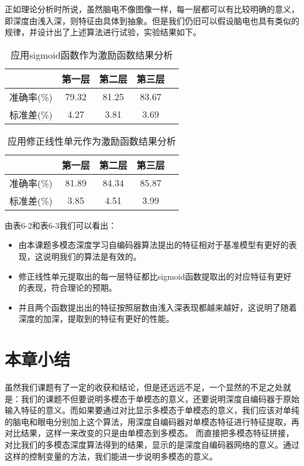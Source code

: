 	正如理论分析时所说，虽然脑电不像图像一样，每一层都可以有比较明确的意义，即深度由浅入深，则特征由具体到抽象。但是我们仍旧可以假设脑电也具有类似的规律，并设计出了上述算法进行试验，实验结果如下。
	
	\begin{table}[!hbp]
	\centering
\begin{tabular}{|c|c|c|c|c|}
\hline
\hline
  & 第一层 & 第二层 & 第三层 \\
\hline
准确率(\%) & 79.32 & 81.25 & 83.67\\
\hline
标准差(\%) & 4.27 & 3.81 & 3.69 \\
\hline
\end{tabular}
\caption{应用sigmoid函数作为激励函数结果分析}
\end{table} 

	\begin{table}[!hbp]
	\centering
\begin{tabular}{|c|c|c|c|c|}
\hline
\hline
  & 第一层 & 第二层 & 第三层 \\
\hline
准确率(\%) & 81.89 & 84.34 & 85.87\\
\hline
标准差(\%) & 3.85 & 4.51 & 3.99 \\
\hline
\end{tabular}
\caption{应用修正线性单元作为激励函数结果分析}
\end{table} 

	由表6-2和表6-3我们可以看出：
	\begin{itemize}
	\item 由本课题多模态深度学习自编码器算法提出的特征相对于基准模型有更好的表现，这说明我们的算法是有效的。
	\item 修正线性单元提取出的每一层特征都比sigmoid函数提取出的对应特征有更好的表现，符合理论的预期。
	\item 并且两个函数提出出的特征按照层数由浅入深表现都越来越好，这说明了随着深度的加深，提取到的特征有更好的性能。
	\end{itemize}
	\section{本章小结}
	虽然我们课题有了一定的收获和结论，但是还远远不足，一个显然的不足之处就是：我们的课题不但要说明多模态于单模态的意义，还要说明深度自编码器于原始输入特征的意义。而如果要通过对比显示多模态于单模态的意义，我们应该对单纯的脑电和眼电分别加上这个算法，用深度自编码器对单模态特征进行特征提取，再对比结果，这样一来改变的只是由单模态到多模态。 而直接把多模态特征拼接，对比我们的多模态深度算法得到的结果，显示的是深度自编码器网络的意义。通过这样的控制变量的方法，我们能进一步说明多模态的意义。

